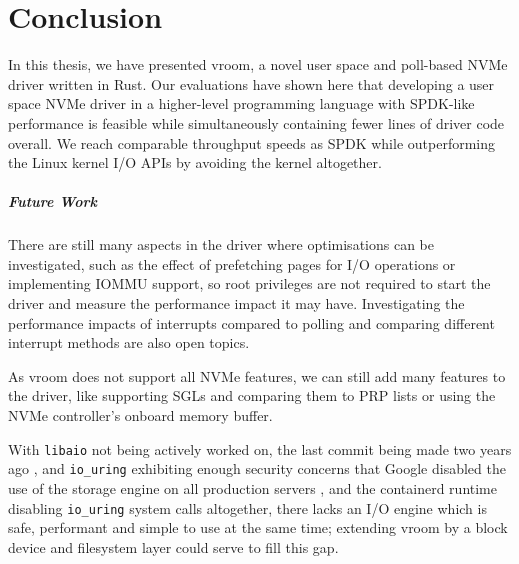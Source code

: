\chapter{Conclusion}\label{c:c}
In this thesis, we have presented vroom, a novel user space and poll-based NVMe driver written in Rust. Our evaluations have shown here that developing a user space NVMe driver in a higher-level programming language with SPDK-like performance is feasible while simultaneously containing fewer lines of driver code overall. We reach comparable throughput speeds as SPDK while outperforming the Linux kernel I/O APIs by avoiding the kernel altogether.

\paragraph{Future Work}
There are still many aspects in the driver where optimisations can be investigated, such as the effect of prefetching pages for I/O operations or implementing IOMMU support, so root privileges are not required to start the driver and measure the performance impact it may have. Investigating the performance impacts of interrupts compared to polling and comparing different interrupt methods are also open topics.

As vroom does not support all NVMe features, we can still add many features to the driver, like supporting SGLs and comparing them to PRP lists or using the NVMe controller's onboard memory buffer.

With \texttt{libaio} not being actively worked on, the last commit being made two years ago \cite{libaio-source}, and \texttt{io\_uring} exhibiting enough security concerns that Google disabled the use of the storage engine on all production servers \cite{google-iou}, and the containerd runtime disabling \texttt{io\_uring} system calls \cite{containerdeez-nuts} altogether, there lacks an I/O engine which is safe, performant and simple to use at the same time; extending vroom by a block device and filesystem layer could serve to fill this gap.
